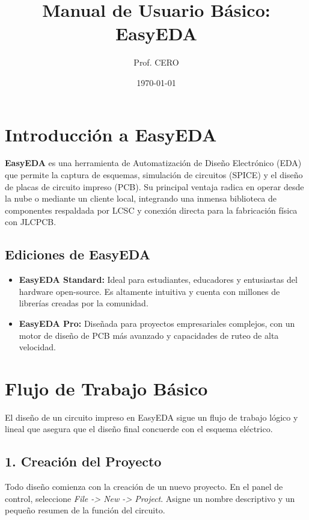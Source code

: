 \documentclass[12pt,a4paper]{article}
\title{Manual de Usuario Básico: EasyEDA}
\author{Prof. CERO}
\date{\today}
\begin{document}
\maketitle
\tableofcontents
\newpage

\section{Introducción a EasyEDA}

\textbf{EasyEDA} es una herramienta de Automatización de Diseño Electrónico (EDA) que permite la captura de esquemas, simulación de circuitos (SPICE) y el diseño de placas de circuito impreso (PCB). Su principal ventaja radica en operar desde la nube o mediante un cliente local, integrando una inmensa biblioteca de componentes respaldada por LCSC y conexión directa para la fabricación física con JLCPCB.

\subsection{Ediciones de EasyEDA}
\begin{itemize}
    \item \textbf{EasyEDA Standard:} Ideal para estudiantes, educadores y entusiastas del hardware open-source. Es altamente intuitiva y cuenta con millones de librerías creadas por la comunidad.
    \item \textbf{EasyEDA Pro:} Diseñada para proyectos empresariales complejos, con un motor de diseño de PCB más avanzado y capacidades de ruteo de alta velocidad.
\end{itemize}

\section{Flujo de Trabajo Básico}

El diseño de un circuito impreso en EasyEDA sigue un flujo de trabajo lógico y lineal que asegura que el diseño final concuerde con el esquema eléctrico.

\subsection{1. Creación del Proyecto}
Todo diseño comienza con la creación de un nuevo proyecto. En el panel de control, seleccione \textit{File -> New -> Project}. Asigne un nombre descriptivo y un pequeño resumen de la función del circuito.
\end{document}
